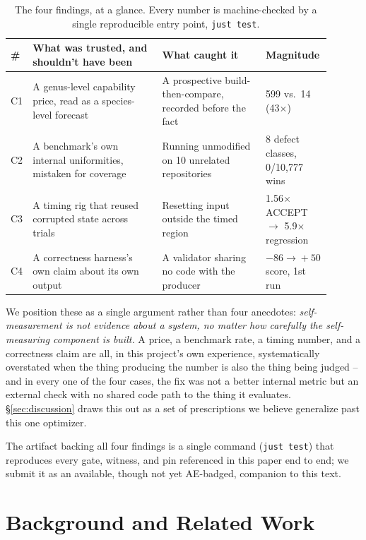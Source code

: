 \documentclass[sigconf,review,anonymous]{acmart}
\begin{document}
\begin{table}[t]
\caption{The four findings, at a glance. Every number is machine-checked by
a single reproducible entry point, \texttt{just test}.}
\label{tab:summary}
\small
\begin{tabular}{@{}p{0.03\linewidth}p{0.40\linewidth}p{0.32\linewidth}p{0.15\linewidth}@{}}
\toprule
\textbf{\#} & \textbf{What was trusted, and shouldn't have been} & \textbf{What caught it} & \textbf{Magnitude} \\
\midrule
C1 & A genus-level capability price, read as a species-level forecast & A prospective build-then-compare, recorded before the fact & 599 vs.\ 14 (43$\times$) \\
\addlinespace
C2 & A benchmark's own internal uniformities, mistaken for coverage & Running unmodified on 10 unrelated repositories & 8 defect classes, 0/10{,}777 wins \\
\addlinespace
C3 & A timing rig that reused corrupted state across trials & Resetting input outside the timed region & 1.56$\times$ ACCEPT $\rightarrow$ 5.9$\times$ regression \\
\addlinespace
C4 & A correctness harness's own claim about its own output & A validator sharing no code with the producer & $-86 \rightarrow{}+50$ score, 1st run \\
\bottomrule
\end{tabular}
\end{table}

We position these as a single argument rather than four anecdotes:
\emph{self-measurement is not evidence about a system, no matter how
carefully the self-measuring component is built.} A price, a benchmark rate,
a timing number, and a correctness claim are all, in this project's own
experience, systematically overstated when the thing producing the number is
also the thing being judged -- and in every one of the four cases, the fix
was not a better internal metric but an external check with no shared code
path to the thing it evaluates. \S\ref{sec:discussion} draws this out as a
set of prescriptions we believe generalize past this one optimizer.

The artifact backing all four findings is a single command
(\texttt{just test}) that reproduces every gate, witness, and pin referenced
in this paper end to end; we submit it as an available, though not yet
AE-badged, companion to this text.

\section{Background and Related Work}
\label{sec:background}
\end{document}
